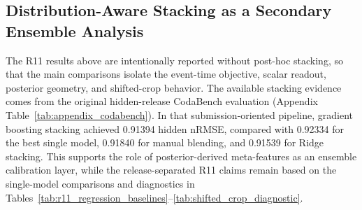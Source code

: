 \documentclass[12pt]{article}
\begin{document}
\begin{table}[!t]
\centering
\caption{Shifted-crop diagnostic on the R11 common-inside subset. The ideal within-crop event localizer has raw shift slope $-1$; a crop-invariant scalar shortcut has slope 0. Reference nRMSE is computed at the standard $s=0.5$~s crop.}
\label{tab:shifted_crop_diagnostic}
\scriptsize
\setlength{\tabcolsep}{3pt}
\renewcommand{\arraystretch}{1.12}
\end{table}

\subsection{Distribution-Aware Stacking as a Secondary Ensemble Analysis}

The R11 results above are intentionally reported without post-hoc stacking, so that the main comparisons isolate the event-time objective, scalar readout, posterior geometry, and shifted-crop behavior. The available stacking evidence comes from the original hidden-release CodaBench evaluation (Appendix Table~\ref{tab:appendix_codabench}). In that submission-oriented pipeline, gradient boosting stacking achieved 0.91394 hidden nRMSE, compared with 0.92334 for the best single model, 0.91840 for manual blending, and 0.91539 for Ridge stacking. This supports the role of posterior-derived meta-features as an ensemble calibration layer, while the release-separated R11 claims remain based on the single-model comparisons and diagnostics in Tables~\ref{tab:r11_regression_baselines}--\ref{tab:shifted_crop_diagnostic}.
\end{document}
